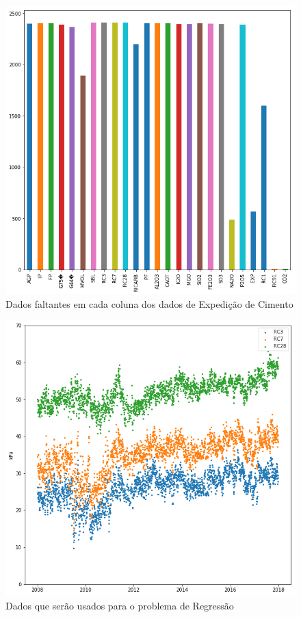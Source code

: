 \documentclass{beamer}
\begin{document}
\begin{frame}
\begin{figure}[H]
\centering
\includegraphics[scale=0.3]{slides_dados_faltando}
\caption{Dados faltantes em cada coluna dos dados de Expedição de Cimento}
\end{figure}

\end{frame}

\begin{frame}
\begin{figure}[H]
\centering
\includegraphics[scale=0.4]{slides_dados}
\caption{Dados que serão usados para o problema de Regressão}
\end{figure}

\end{frame}
\end{document}
